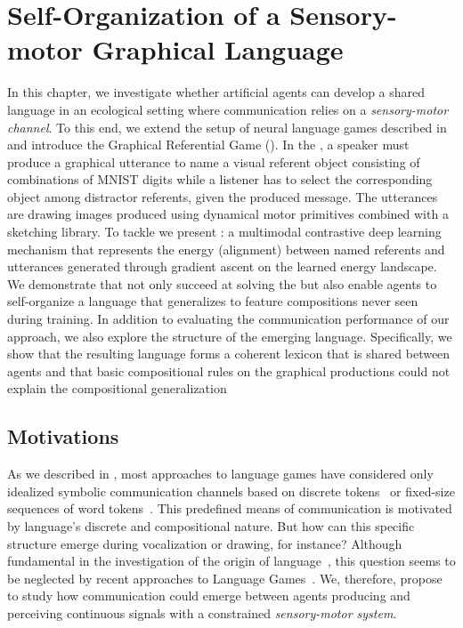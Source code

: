 \chapter{Self-Organization of a Sensory-motor Graphical Language}
\label{chap:curves}
\minitoc

In this chapter, we investigate whether artificial agents can develop a shared language in an ecological setting where communication relies on a \emph{sensory-motor channel}. To this end, we extend the setup of neural language games described in  and introduce the Graphical Referential Game (\greg). In the \greg, a speaker must produce a graphical utterance to name a visual referent object consisting of combinations of MNIST digits while a listener has to select the corresponding object among distractor referents, given the produced message. The utterances are drawing images produced using dynamical motor primitives combined with a sketching library. To tackle \greg we present \curves: a multimodal contrastive deep learning mechanism that represents the energy (alignment) between named referents and utterances generated through gradient ascent on the learned energy landscape. We demonstrate that \curves not only succeed at solving the \greg but also enable agents to self-organize a language that generalizes to feature compositions never seen during training. In addition to evaluating the communication performance of our approach, we also explore the structure of the emerging language. Specifically, we show that the resulting language forms a coherent lexicon that is shared between agents and that basic compositional rules on the graphical productions could not explain the compositional generalization

\section{Motivations}

\label{sec:intro_curves}

As we described in , most approaches to language games have considered only idealized symbolic communication channels based on discrete tokens~\citep{lazaridou2017multiagent,mordatch2018emergence,chaabouni2021communicating} or fixed-size sequences of word tokens~\citep{havrylov2017emergence,portelance2021emergence}. This predefined means of communication is motivated by language's discrete and compositional nature. But how can this specific structure emerge during vocalization or drawing, for instance? Although fundamental in the investigation of the origin of language~\citep{Dessalles2000,cheney2005constraints,oller2019language}, this question seems to be neglected by recent approaches to Language Games~\citep{moulinfrier2020multi}. We, therefore, propose to study how communication could emerge between agents producing and perceiving continuous signals with a constrained \textit{sensory-motor system}.

